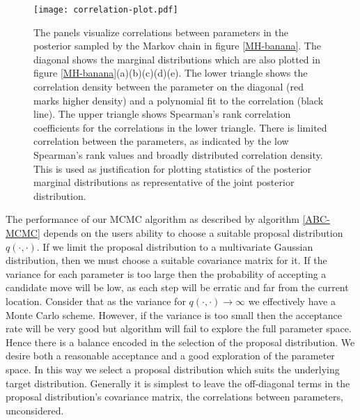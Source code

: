 \begin{figure}[H]
	\centering
	\texttt{[image: correlation-plot.pdf]}
	\caption{The panels visualize correlations between parameters in the posterior sampled by the Markov chain in figure \ref{MH-banana}. The diagonal shows the marginal distributions which are also plotted in figure \ref{MH-banana}(a)(b)(c)(d)(e). The lower triangle shows the correlation density between the parameter on the diagonal (red marks higher density) and a polynomial fit to the correlation (black line). The upper triangle shows Spearman's rank correlation coefficients for the correlations in the lower triangle. There is limited correlation between the parameters, as indicated by the low Spearman's rank values and broadly distributed correlation density. This is used as justification for plotting statistics of the posterior marginal distributions as representative of the joint posterior distribution.}
	\label{correlation-plot}
\end{figure}


The performance of our MCMC algorithm as described by algorithm \ref{ABC-MCMC} depends on the users ability to choose a suitable proposal distribution $q(\cdot,\cdot)$. If we limit the proposal distribution to a multivariate Gaussian distribution, then we must choose a suitable covariance matrix for it. If the variance for each parameter is too large then the probability of accepting a candidate move will be low, as each step will be erratic and far from the current location. Consider that as the variance for $q(\cdot,\cdot) \rightarrow \infty$ we effectively have a Monte Carlo scheme. However, if the variance is too small then the acceptance rate will be very good but algorithm will fail to explore the full parameter space. Hence there is a balance encoded in the selection of the proposal distribution. We desire both a reasonable acceptance and a good exploration of the parameter space. In this way we select a proposal distribution which suits the underlying target distribution. Generally it is simplest to leave the off-diagonal terms in the proposal distribution's covariance matrix, the correlations between parameters, unconsidered.\\


